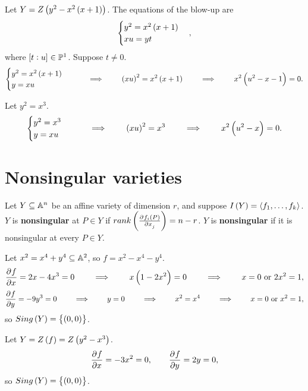 \begin{example}
Let $ Y = Z\br{y^2 - x^2\br{x + 1}} $. The equations of the blow-up are
$$
\begin{cases}
y^2 = x^2\br{x + 1} \\
xu = yt
\end{cases},
$$
where $ \sbr{t : u} \in \P^1 $. Suppose $ t \ne 0 $.
$$
\begin{cases}
y^2 = x^2\br{x + 1} \\
y = xu
\end{cases}
\qquad \implies \qquad \br{xu}^2 = x^2\br{x + 1} \qquad \implies \qquad x^2\br{u^2 - x - 1} = 0.
$$
\end{example}

\begin{example}
Let $ y^2 = x^3 $.
$$
\begin{cases}
y^2 = x^3 \\
y = xu
\end{cases}
\qquad \implies \qquad \br{xu}^2 = x^3 \qquad \implies \qquad x^2\br{u^2 - x} = 0.
$$
\end{example}

\pagebreak

\section{Nonsingular varieties}


\begin{definition}
Let $ Y \subseteq \mathbb{A}^n $ be an affine variety of dimension $ r $, and suppose $ I\br{Y} = \abr{f_1, \dots, f_k} $. $ Y $ is \textbf{nonsingular} at $ P \in Y $ if $ rank\br{\tpd{f_i\br{P}}{x_j}} = n - r $. $ Y $ is \textbf{nonsingular} if it is nonsingular at every $ P \in Y $.
\end{definition}

\begin{example}
Let $ x^2 = x^4 + y^4 \subseteq \mathbb{A}^2 $, so $ f = x^2 - x^4 - y^4 $.
$$ \dpd{f}{x} = 2x - 4x^3 = 0 \qquad \implies \qquad x\br{1 - 2x^2} = 0 \qquad \implies \qquad x = 0 \ \text{or} \ 2x^2 = 1, $$
$$ \dpd{f}{y} = -9y^3 = 0 \qquad \implies \qquad y = 0 \qquad \implies \qquad x^2 = x^4 \qquad \implies \qquad x = 0 \ \text{or} \ x^2 = 1, $$
so $ Sing\br{Y} = \cbr{\br{0, 0}} $.
\end{example}

\begin{example}
Let $ Y = Z\br{f} = Z\br{y^2 - x^3} $.
$$ \dpd{f}{x} = -3x^2 = 0, \qquad \dpd{f}{y} = 2y = 0, $$
so $ Sing\br{Y} = \cbr{\br{0, 0}} $.
\end{example}

